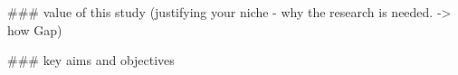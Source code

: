 



\#\#\# value of this study
(justifying your niche - why the research is needed. -> how Gap)

\#\#\# key aims and objectives





